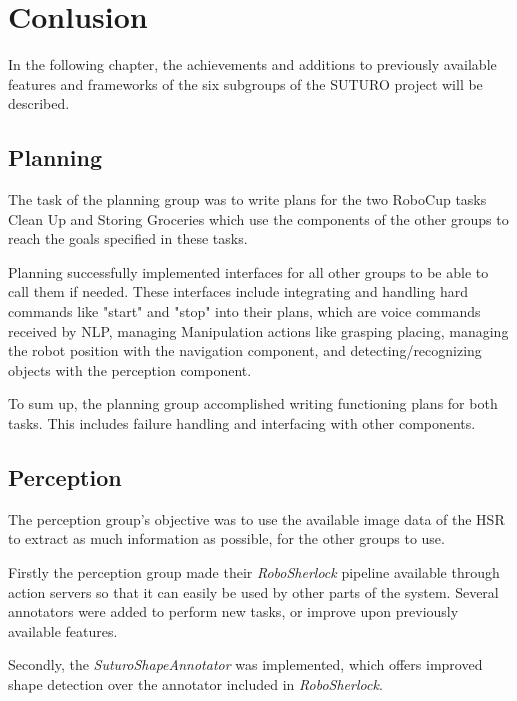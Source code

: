 \documentclass[main.tex]{subfiles}
\begin{document}
	\begingroup

	\renewcommand{\cleardoublepage}{}

	\renewcommand{\clearpage}{}

	\chapter{Conlusion}
		In the following chapter, the achievements and additions to previously available features and frameworks of the six subgroups of the SUTURO project will be described.
		
		\section{Planning}
		The task of the planning group was to write plans for the two RoboCup tasks Clean Up and Storing Groceries which use the components of the other groups to reach the goals specified in these tasks.
		
		Planning successfully implemented interfaces for all other groups to be able to call them if needed. These interfaces include integrating and handling hard commands like "start" and "stop" into their plans, which are voice commands received by NLP, managing Manipulation actions like grasping placing, managing the robot position with the navigation component, and detecting/recognizing objects with the perception component.
		
		To sum up, the planning group accomplished writing functioning plans for both tasks. This includes failure handling and interfacing with other components.
		
		\section{Perception}
		The perception group's objective was to use the available image data of the HSR to extract as much information as possible, for the other groups to use.
				
		Firstly the perception group made their \textit{RoboSherlock} pipeline available through action servers so that it can easily be used by other parts of the system. Several annotators were added to perform new tasks, or improve upon previously available features. 
		
		Secondly, the \textit{SuturoShapeAnnotator} was implemented, which offers improved shape detection over the annotator included in \textit{RoboSherlock}. 
		
\end{document}
